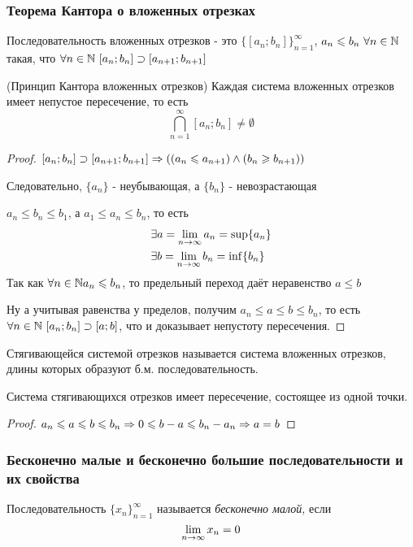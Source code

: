 \subsubsection{Теорема Кантора о вложенных отрезках}
\begin{definition}
	Последовательность вложенных отрезков - это $\{[a_n; b_n]\}_{n = 1}^\infty$, $a_n \leqslant b_n\ \forall n \in \mathbb{N}$ такая, что $\forall n \in \mathbb{N}\ [a_n; b_n] \supset [a_{n + 1}; b_{n + 1}]$
\end{definition}

\begin{theorem} (Принцип Кантора вложенных отрезков)
	Каждая система вложенных отрезков имеет непустое пересечение, то есть
	\[
		\bigcap\limits_{n = 1}^\infty [a_n; b_n] \neq \emptyset
	\]
\end{theorem}

\begin{proof}
	$[a_n; b_n] \supset [a_{n + 1}; b_{n + 1}] \Rightarrow \left((a_n \leqslant a_{n + 1}) \wedge (b_n \geqslant b_{n + 1})\right)$
	
	Следовательно, $\{a_n\}$ - неубывающая, а $\{b_n\}$ - невозрастающая
	
	$a_n \le b_n \le b_1$, а $a_1 \le a_n \le b_n$, то есть
	\begin{align*}
		&\exists a = \lim\limits_{n \rightarrow \infty} a_n = \sup \{a_n\}
		\\
		&\exists b = \lim\limits_{n \rightarrow \infty} b_n = \inf \{b_n\}
	\end{align*}
	Так как $\forall n \in \mathbb{N} a_n \leqslant b_n$, то предельный переход даёт неравенство $a \le b$
	
	Ну а учитывая равенства у пределов, получим $a_n \le a \le b \le b_n$, то есть $\forall n \in \mathbb{N}\ [a_n; b_n] \supset [a; b]$, что и доказывает непустоту пересечения.
\end{proof}

\begin{definition}
	Стягивающейся системой отрезков называется система вложенных отрезков, длины которых образуют б.м. последовательность.
\end{definition}

\begin{addition}
	Система стягивающихся отрезков имеет пересечение, состоящее из одной точки.
\end{addition}
\begin{proof}
	$a_n \leqslant a \leqslant b \leqslant b_n \Rightarrow 0 \leqslant b - a \leqslant b_n - a_n \Rightarrow a = b$
\end{proof}

\subsubsection{Бесконечно малые и бесконечно большие последовательности и их свойства}
\begin{definition}
	Последовательность $\{x_n\}_{n = 1}^\infty$ называется \textit{бесконечно малой}, если 
	$$
		\lim\limits_{n \rightarrow \infty} x_n = 0
	$$
\end{definition}


